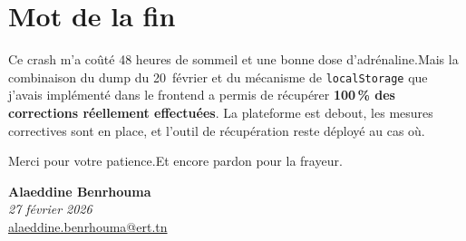 \documentclass[11pt,a4paper]{article}
\begin{document}
\section*{Mot de la fin}

Ce crash m'a co\^{u}t\'{e} 48 heures de sommeil et une bonne dose d'adr\'{e}naline.\@ Mais la combinaison du dump du 20~f\'{e}vrier et du m\'{e}canisme de \texttt{localStorage} que j'avais impl\'{e}ment\'{e} dans le frontend a permis de r\'{e}cup\'{e}rer \textbf{100\,\% des corrections r\'{e}ellement effectu\'{e}es}. La plateforme est debout, les mesures correctives sont en place, et l'outil de r\'{e}cup\'{e}ration reste d\'{e}ploy\'{e} au cas o\`{u}.

Merci pour votre patience.\@ Et encore pardon pour la frayeur.

\vspace{0.8cm}
\begin{flushright}
	\textbf{Alaeddine Benrhouma}\\
	\textit{27 f\'{e}vrier 2026}\\
	\href{mailto:alaeddine.benrhouma@ert.tn}{alaeddine.benrhouma@ert.tn}
\end{flushright}

\label{LastPage}
\end{document}
